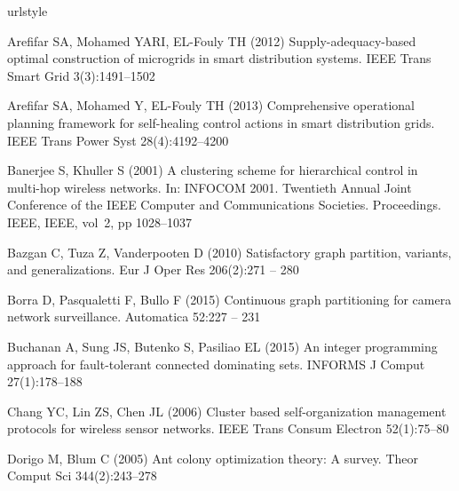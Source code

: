       

\begin{thebibliography}{38}
\providecommand{\natexlab}[1]{#1}
\providecommand{\url}[1]{{#1}}
\providecommand{\urlprefix}{URL }
\expandafter\ifx\csname urlstyle\endcsname\relax
  \providecommand{\doi}[1]{DOI~\discretionary{}{}{}#1}\else
  \providecommand{\doi}{DOI~\discretionary{}{}{}\begingroup
  \urlstyle{rm}\Url}\fi
\providecommand{\eprint}[2][]{\url{#2}}

Arefifar SA, Mohamed YARI, EL-Fouly TH (2012) Supply-adequacy-based optimal
  construction of microgrids in smart distribution systems. IEEE Trans Smart
  Grid 3(3):1491--1502

Arefifar SA, Mohamed Y, EL-Fouly TH (2013) Comprehensive operational planning
  framework for self-healing control actions in smart distribution grids. IEEE
  Trans Power Syst 28(4):4192--4200

Banerjee S, Khuller S (2001) A clustering scheme for hierarchical control in
  multi-hop wireless networks. In: INFOCOM 2001. Twentieth Annual Joint
  Conference of the IEEE Computer and Communications Societies. Proceedings.
  IEEE, IEEE, vol~2, pp 1028--1037

Bazgan C, Tuza Z, Vanderpooten D (2010) Satisfactory graph partition, variants,
  and generalizations. Eur J Oper Res 206(2):271 -- 280

Borra D, Pasqualetti F, Bullo F (2015) Continuous graph partitioning for camera
  network surveillance. Automatica 52:227 -- 231

Buchanan A, Sung JS, Butenko S, Pasiliao EL (2015) An integer programming
  approach for fault-tolerant connected dominating sets. INFORMS J Comput
  27(1):178--188

Chang YC, Lin ZS, Chen JL (2006) Cluster based self-organization management
  protocols for wireless sensor networks. IEEE Trans Consum Electron
  52(1):75--80

Dorigo M, Blum C (2005) Ant colony optimization theory: A survey. Theor Comput
  Sci 344(2):243--278


\end{thebibliography}
